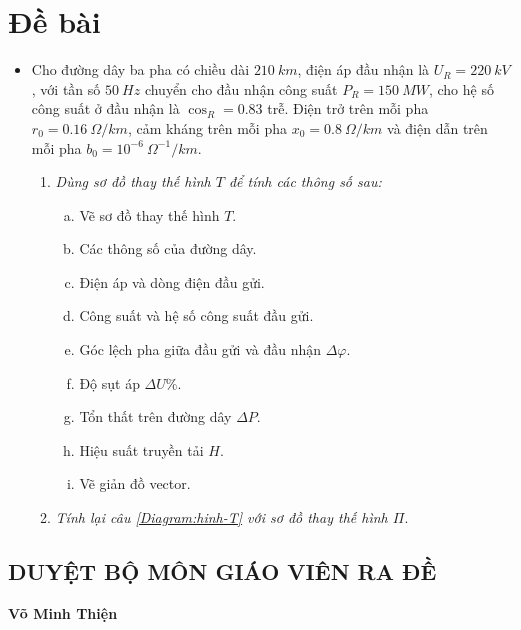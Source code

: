 \documentclass[a4paper, 12pt]{article}
\newcommand{\unit}[1]{~#1}
\begin{document}
\section*{\hspace{1cm}Đề bài}
\begin{itemize}
\item[] Cho đường dây ba pha có chiều dài $210 \unit{km}$, điện áp đầu nhận là $U_R = 220 \unit{kV}$, với tần số $50 \unit{Hz}$ chuyển cho đầu nhận công suất $P_R = 150 \unit{MW}$, cho hệ số  công suất ở đầu nhận là $\cos_R = 0.83$ trễ. Điện trở trên mỗi pha $r_0 = 0.16 \unit{\Omega/km}$, cảm kháng trên mỗi pha $x_0 = 0.8 \unit{\Omega/km}$ và điện dẫn trên mỗi pha $b_0 = 10^{-6} \unit{\Omega^{-1}/km}$.
\begin{enumerate}[\it 1.]
	\item \textit{Dùng sơ đồ thay thế hình $T$ để tính các thông số sau:}\label{Diagram:hinh-T}
	\begin{enumerate}[a.]
		\item Vẽ sơ đồ thay thế hình $T$.
		\item Các thông số của đường dây.
		\item Điện áp và dòng điện đầu gửi.
		\item Công suất và hệ số công suất đầu gửi.
		\item Góc lệch pha giữa đầu gửi và đầu nhận $\Delta \varphi$.
		\item Độ sụt áp $\Delta U\%$.
		\item Tổn thất trên đường dây $\Delta P$.
		\item Hiệu suất truyền tải $H$.
		\item Vẽ giản đồ vector.
	\end{enumerate}
	\item \textit{Tính lại câu \ref{Diagram:hinh-T} với sơ đồ thay thế hình $\Pi$}.
\end{enumerate}
\end{itemize}
\subsection*{\hspace{2cm} DUYỆT BỘ MÔN \hspace{5cm} GIÁO VIÊN RA ĐỀ}
\vspace{1.5cm}
\begin{large}
\hspace{13cm}\textbf{Võ Minh Thiện}
\end{large}
\end{document}
